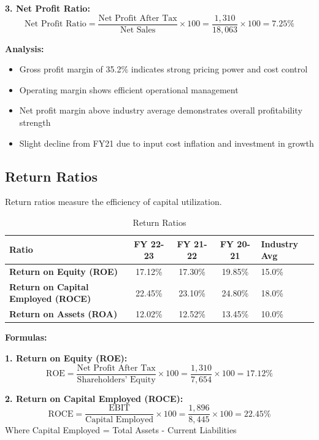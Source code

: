 \documentclass[12pt,a4paper]{article}
\begin{document}
\textbf{3. Net Profit Ratio:}
\[
\text{Net Profit Ratio} = \frac{\text{Net Profit After Tax}}{\text{Net Sales}} \times 100 = \frac{1,310}{18,063} \times 100 = 7.25\%
\]

\textbf{Analysis:}
\begin{itemize}
    \item Gross profit margin of 35.2\% indicates strong pricing power and cost control
    \item Operating margin shows efficient operational management
    \item Net profit margin above industry average demonstrates overall profitability strength
    \item Slight decline from FY21 due to input cost inflation and investment in growth
\end{itemize}

\subsection{Return Ratios}

Return ratios measure the efficiency of capital utilization.

\begin{table}[H]
    \centering
    \caption{Return Ratios}
    \begin{tabular}{|l|c|c|c|l|}
        \hline
        \textbf{Ratio} & \textbf{FY 22-23} & \textbf{FY 21-22} & \textbf{FY 20-21} & \textbf{Industry Avg} \\
        \hline
        \textbf{Return on Equity (ROE)} & 17.12\% & 17.30\% & 19.85\% & 15.0\% \\
        \hline
        \textbf{Return on Capital Employed (ROCE)} & 22.45\% & 23.10\% & 24.80\% & 18.0\% \\
        \hline
        \textbf{Return on Assets (ROA)} & 12.02\% & 12.52\% & 13.45\% & 10.0\% \\
        \hline
    \end{tabular}
\end{table}

\textbf{Formulas:}

\textbf{1. Return on Equity (ROE):}
\[
\text{ROE} = \frac{\text{Net Profit After Tax}}{\text{Shareholders' Equity}} \times 100 = \frac{1,310}{7,654} \times 100 = 17.12\%
\]

\textbf{2. Return on Capital Employed (ROCE):}
\[
\text{ROCE} = \frac{\text{EBIT}}{\text{Capital Employed}} \times 100 = \frac{1,896}{8,445} \times 100 = 22.45\%
\]
Where Capital Employed = Total Assets - Current Liabilities
\end{document}
